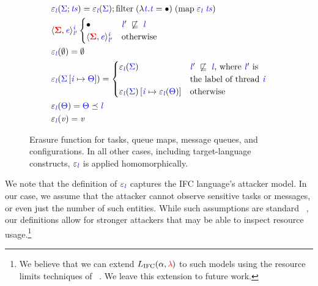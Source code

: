 \documentclass{sigplanconf}
\newcommand{\Varid}[1]{\mathit{#1}}
\newcommand{\Red}[1]{{\color{red} #1}}
\newcommand{\tocite}[1]{\Red{\cite{#1}}}
\begin{document}
\begin{figure} %
\begin{align*}
  &\ensuremath{\varepsilon_{\ifc{\Varid{l}}}(\ifc{\Sigma};\ifc{\Varid{ts}})\mathrel{=}\varepsilon_{\ifc{\Varid{l}}}(\ifc{\Sigma});\text{filter}\;(\lambda \ifc{\Varid{t}}.\ifc{\Varid{t}}\mathrel{=}\bullet)\;(\text{map}\;\varepsilon_{\ifc{\Varid{l}}}\;\ifc{\Varid{ts}})}\\
  &\ensuremath{\langle \tar{\Sigma}, \ifc{\Varid{e}}\rangle^{\ifc{\Varid{i}}}_{\ifc{\Varid{l}}'}} \begin{cases}
    \ensuremath{\bullet} & \ensuremath{\ifc{\Varid{l}}'\;\not\flows\;\ifc{\Varid{l}}} \\
    \ensuremath{\langle \tar{\Sigma}, \ifc{\Varid{e}}\rangle^{\ifc{\Varid{i}}}_{\ifc{\Varid{l}}'}} & \text{otherwise}
  \end{cases} \\
  &\ensuremath{\varepsilon_{\ifc{\Varid{l}}}(\emptyset)\mathrel{=}\emptyset}\\
  &\ensuremath{\varepsilon_{\ifc{\Varid{l}}}(\ifc{\Sigma}\left[\ifc{\Varid{i}}\mapsto{}\ifc{\Theta}\right])\mathrel{=}} \begin{cases}
    \ensuremath{\varepsilon_{\ifc{\Varid{l}}}(\ifc{\Sigma})} & \text{\ensuremath{\ifc{\Varid{l}}'\;\not\flows\;\ifc{\Varid{l}}}, where \ensuremath{\ifc{\Varid{l}}'} is}\\
    & \text{the label of thread \ensuremath{\ifc{\Varid{i}}}} \\
    \ensuremath{\varepsilon_{\ifc{\Varid{l}}}(\ifc{\Sigma})\left[\ifc{\Varid{i}}\mapsto{}\varepsilon_{\ifc{\Varid{l}}}(\ifc{\Theta})\right]} & \text{otherwise}
  \end{cases} \\
  &\ensuremath{\varepsilon_{\ifc{\Varid{l}}}(\ifc{\Theta})\mathrel{=}\ifc{\Theta}\preceq\ifc{\Varid{l}}}\\
  &\ensuremath{\varepsilon_{\ifc{\Varid{l}}}(\Varid{v})\mathrel{=}\Varid{v}}
\end{align*}
\caption{ Erasure function for tasks, queue maps, message queues, and
configurations.  In all other cases, including target-language constructs,
\ensuremath{\varepsilon_{\ifc{\Varid{l}}}} is applied homomorphically.  \label{fig:erasure} }
\end{figure}

We note that the definition of \ensuremath{\varepsilon_{\ifc{\Varid{l}}}} captures the IFC
language's attacker model. 
%
In our case, we assume that the attacker cannot observe sensitive tasks or
messages, or even just the number of such entities.
%
While such assumptions are standard~\tocite{}, our definitions allow for
stronger attackers that may be able to inspect resource usage.\footnote{
  We believe that we can extend \ensuremath{L_\text{IFC}(\alpha,\Red{\lambda}\;\!\!)} to
  such models using the resource limits techniques of~\tocite{}.
  We leave this extension to future work.
}
\end{document}
